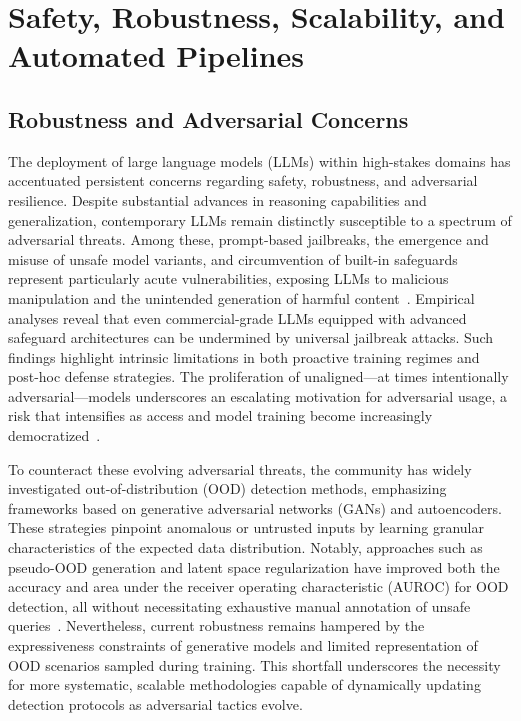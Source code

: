 \documentclass[sigconf]{acmart}
\begin{document}
\section{Safety, Robustness, Scalability, and Automated Pipelines}

\subsection{Robustness and Adversarial Concerns}

The deployment of large language models (LLMs) within high-stakes domains has accentuated persistent concerns regarding safety, robustness, and adversarial resilience. Despite substantial advances in reasoning capabilities and generalization, contemporary LLMs remain distinctly susceptible to a spectrum of adversarial threats. Among these, prompt-based jailbreaks, the emergence and misuse of unsafe model variants, and circumvention of built-in safeguards represent particularly acute vulnerabilities, exposing LLMs to malicious manipulation and the unintended generation of harmful content~\cite{ref78,ref82}. Empirical analyses reveal that even commercial-grade LLMs equipped with advanced safeguard architectures can be undermined by universal jailbreak attacks. Such findings highlight intrinsic limitations in both proactive training regimes and post-hoc defense strategies. The proliferation of unaligned—at times intentionally adversarial—models underscores an escalating motivation for adversarial usage, a risk that intensifies as access and model training become increasingly democratized~\cite{ref78}.

To counteract these evolving adversarial threats, the community has widely investigated out-of-distribution (OOD) detection methods, emphasizing frameworks based on generative adversarial networks (GANs) and autoencoders. These strategies pinpoint anomalous or untrusted inputs by learning granular characteristics of the expected data distribution. Notably, approaches such as pseudo-OOD generation and latent space regularization have improved both the accuracy and area under the receiver operating characteristic (AUROC) for OOD detection, all without necessitating exhaustive manual annotation of unsafe queries~\cite{ref82}. Nevertheless, current robustness remains hampered by the expressiveness constraints of generative models and limited representation of OOD scenarios sampled during training. This shortfall underscores the necessity for more systematic, scalable methodologies capable of dynamically updating detection protocols as adversarial tactics evolve.
\end{document}
